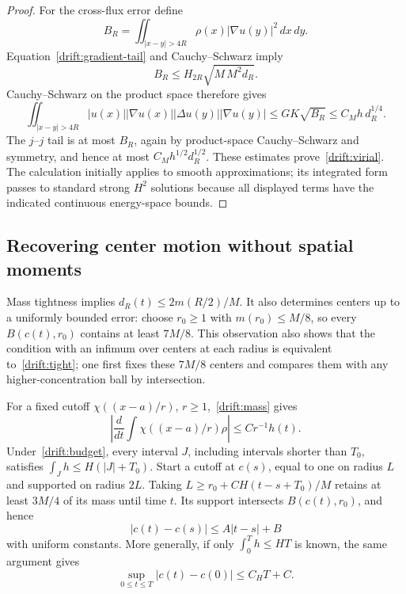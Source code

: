 \begin{proof}
For the cross-flux error define
\[
 B_R=\iint_{|x-y|>4R}\rho(x)|\nabla u(y)|^2\,dx\,dy.
\]
Equation~\eqref{drift:gradient-tail} and Cauchy--Schwarz imply
\[
 B_R\le H_{2R}\sqrt{M\,M^2d_R}.
\]
Cauchy--Schwarz on the product space therefore gives
\[
 \iint_{|x-y|>4R}|u(x)||\nabla u(x)||\Delta u(y)||\nabla u(y)|
 \le GK\sqrt{B_R}\le C_Mh\,d_R^{1/4}.
\]
The $j$--$j$ tail is at most $B_R$, again by product-space Cauchy--Schwarz and symmetry, and hence at most $C_Mh^{1/2}d_R^{1/2}$. These estimates prove~\eqref{drift:virial}. The calculation initially applies to smooth approximations; its integrated form passes to standard strong $H^2$ solutions because all displayed terms have the indicated continuous energy-space bounds.
\end{proof}

\subsection{Recovering center motion without spatial moments}

Mass tightness implies $d_R(t)\le2m(R/2)/M$. It also determines centers up to a uniformly bounded error: choose $r_0\ge1$ with $m(r_0)\le M/8$, so every $B(c(t),r_0)$ contains at least $7M/8$. This observation also shows that the condition with an infimum over centers at each radius is equivalent to~\eqref{drift:tight}; one first fixes these $7M/8$ centers and compares them with any higher-concentration ball by intersection.

For a fixed cutoff $\chi((x-a)/r)$, $r\ge1$,~\eqref{drift:mass} gives
\begin{equation}\label{drift:cutoff-flux}
 \left|\frac{d}{dt}\int\chi((x-a)/r)\rho\right|
 \le C r^{-1}h(t).
\end{equation}
Under~\eqref{drift:budget}, every interval $J$, including intervals shorter than $T_0$, satisfies
$\int_Jh\le H(|J|+T_0)$. Start a cutoff at $c(s)$, equal to one on radius $L$ and supported on radius $2L$. Taking
$L\ge r_0+C H(t-s+T_0)/M$ retains at least $3M/4$ of its mass until time $t$. Its support intersects $B(c(t),r_0)$, and hence
\begin{equation}\label{drift:coarse}
 |c(t)-c(s)|\le A|t-s|+B
\end{equation}
with uniform constants. More generally, if only $\int_0^Th\le HT$ is known, the same argument gives
\begin{equation}\label{drift:sequence-coarse}
 \sup_{0\le t\le T}|c(t)-c(0)|\le C_HT+C.
\end{equation}

